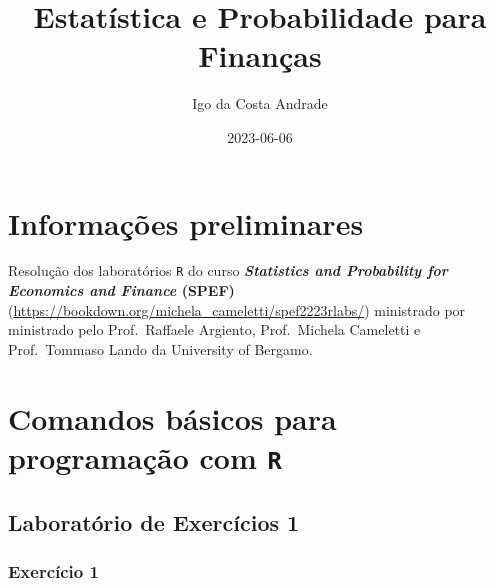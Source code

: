 \documentclass[
]{article}
\title{Estatística e Probabilidade para Finanças}
\author{Igo da Costa Andrade}
\date{2023-06-06}
\begin{document}
\maketitle

{
\setcounter{tocdepth}{2}
\tableofcontents
}
\newpage

\hypertarget{informauxe7uxf5es-preliminares}{%
\section*{Informações preliminares}\label{informauxe7uxf5es-preliminares}}

Resolução dos laboratórios \texttt{R} do curso \textbf{\emph{Statistics and Probability for Economics and Finance} (SPEF)} (\url{https://bookdown.org/michela_cameletti/spef2223rlabs/}) ministrado por ministrado pelo Prof.~Raffaele Argiento, Prof.~Michela Cameletti e Prof.~Tommaso Lando da University of Bergamo.

\hypertarget{comandos-buxe1sicos-para-programauxe7uxe3o-com-r}{%
\section{\texorpdfstring{Comandos básicos para programação com \texttt{R}}{Comandos básicos para programação com R}}\label{comandos-buxe1sicos-para-programauxe7uxe3o-com-r}}

\hypertarget{laboratuxf3rio-de-exercuxedcios-1}{%
\subsection{Laboratório de Exercícios 1}\label{laboratuxf3rio-de-exercuxedcios-1}}

\hypertarget{exercuxedcio-1}{%
\subsubsection{Exercício 1}\label{exercuxedcio-1}}
\end{document}
